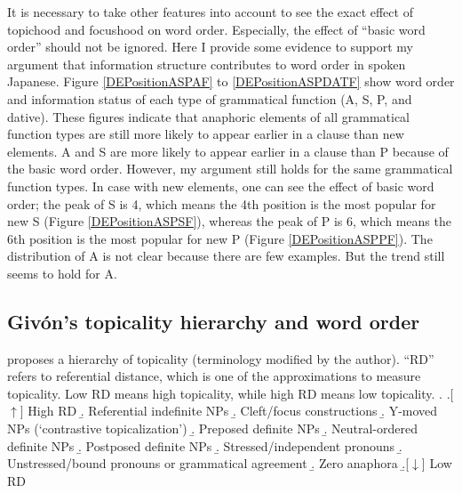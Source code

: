 It is necessary to take other features into account
to see the exact effect of topichood and focushood on word order.
Especially, the effect of ``basic word order'' should not be ignored.
Here I provide some evidence to support my argument that
information structure contributes to word order in spoken Japanese.
Figure \ref{DEPositionASPAF} to \ref{DEPositionASPDATF} show
word order and information status of each type of grammatical function (A, S, P, and dative).
These figures indicate that
anaphoric elements of all grammatical function types are still more likely to appear earlier in a clause than new elements.
A and S are more likely to appear earlier in a clause than P because of the basic word order.
However, my argument still holds for the same grammatical function types.
In case with new elements,
one can see the effect of basic word order;
the peak of S is 4,
which means the 4th position is the most popular for new S (Figure \ref{DEPositionASPSF}),
whereas the peak of P is 6, which means the 6th position is the most popular for new P (Figure \ref{DEPositionASPPF}).
The distribution of A is not clear because there are few examples.
But the trend still seems to hold for A.

\subsection{Giv\'on's topicality hierarchy and word order}\label{WO:Dis:Givon}

 proposes a hierarchy of topicality \Next (terminology modified by the author).
``RD'' refers to referential distance,
which is one of the approximations to measure topicality.
Low RD means high topicality,
while high RD means low topicality.
%
\ex.\label{TopicHierarchy}
 \a.[$\uparrow$] High RD
 \b. Referential indefinite NPs
 \b. Cleft/focus constructions
 \b. Y-moved NPs (`contrastive topicalization')
 \b. Preposed definite NPs
 \b. Neutral-ordered definite NPs
 \b. Postposed definite NPs
 \b. Stressed/independent pronouns
 \b. Unstressed/bound pronouns or grammatical agreement
 \b. Zero anaphora
 \b.[$\downarrow$] Low RD
 \hfill{\cite[][p.~7]{givon83}}

